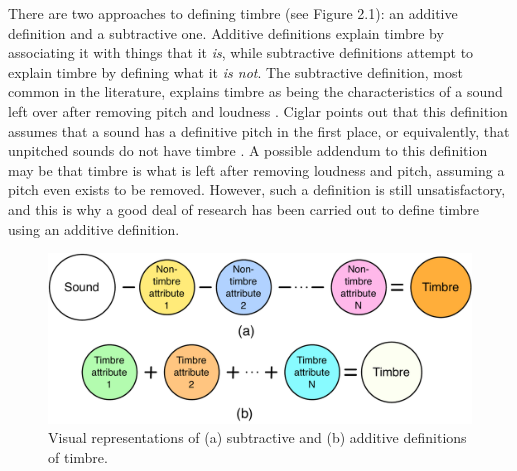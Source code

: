 \documentclass[a4paper,12pt]{report} 	%
\numberwithin{figure}{chapter}
\numberwithin{table}{chapter}
\numberwithin{equation}{chapter}
\begin{document}
\begin{flushleft}
There are two approaches to defining timbre (see Figure 2.1): an additive definition and a subtractive one. Additive definitions explain timbre by associating it with things that it \emph{is}, while subtractive definitions attempt to explain timbre by defining what it \emph{is not}. The subtractive definition, most common in the literature, explains timbre as being the characteristics of a sound left over after removing pitch and loudness \cite[p. 45]{Wessel:1979tg} \cite[p. 225]{Toiviainen:1998hs}. Ciglar points out that this definition assumes that a sound has a definitive pitch in the first place, or equivalently, that unpitched sounds do not have timbre \cite[p. 7]{Ciglar:2009uf}. A possible addendum to this definition may be that timbre is what is left after removing loudness and pitch, assuming a pitch even exists to be removed. However, such a definition is still unsatisfactory, and this is why a good deal of research has been carried out to define timbre using an additive definition.
\\
\begin{figure}[!htp]
\begin{center}
\includegraphics[scale=0.45]{SubtractiveVsAdditive}
\caption[Subtractive vs. Additive Timbre Definitions]{Visual representations of (a) subtractive and (b) additive definitions of timbre.}
\end{center}
\end{figure}

\end{flushleft}
\end{document}
